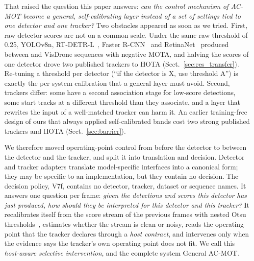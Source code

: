 \documentclass[pdflatex,sn-mathphys-num]{sn-jnl}
\begin{document}
That raised the question this paper answers: \emph{can the control mechanism of AC-MOT become a general, self-calibrating layer instead of a set of settings tied to one detector and one tracker?} Two obstacles appeared as soon as we tried. First, raw detector scores are not on a common scale. Under the same raw threshold of 0.25, YOLOv8n, RT-DETR-L~\cite{zhao2024rtdetr}, Faster R-CNN~\cite{ren2017fasterrcnn} and RetinaNet~\cite{lin2017focal} produced between  and  VisDrone sequences with negative MOTA, and halving the scores of one detector drove two published trackers to  HOTA (Sect.~\ref{sec:res_transfer}). Re-tuning a threshold per detector (``if the detector is X, use threshold A'') is exactly the per-system calibration that a general layer must avoid. Second, trackers differ: some have a second association stage for low-score detections, some start tracks at a different threshold than they associate, and a layer that rewrites the input of a well-matched tracker can harm it. An earlier training-free design of ours that always applied self-calibrated bands cost two strong published trackers  and  HOTA (Sect.~\ref{sec:barrier}).

We therefore moved operating-point control from before the detector to between the detector and the tracker, and split it into translation and decision. Detector and tracker adapters translate model-specific interfaces into a canonical form; they may be specific to an implementation, but they contain no decision. The decision policy, V7f, contains no detector, tracker, dataset or sequence names. It answers one question per frame: \emph{given the detections and scores this detector has just produced, how should they be interpreted for this detector and this tracker?} It recalibrates itself from the score stream of the previous frames with nested Otsu thresholds~\cite{otsu1979}, estimates whether the stream is clean or noisy, reads the operating point that the tracker declares through a \emph{host contract}, and intervenes only when the evidence says the tracker's own operating point does not fit. We call this \emph{host-aware selective intervention}, and the complete system General AC-MOT.
\end{document}
